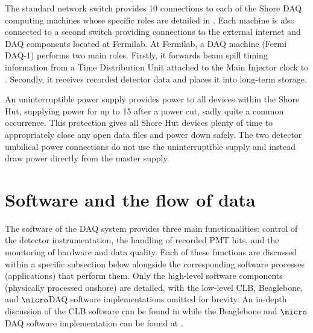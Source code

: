 The standard network switch provides \unit{10}{} connections to each of the Shore DAQ
computing machines whose specific roles are detailed in . Each machine is
also connected to a second switch providing connections to the external internet and DAQ
components located at Fermilab. At Fermilab, a DAQ machine (Fermi DAQ-1) performs two main roles.
Firstly, it forwards \numi beam spill timing information from a Time Distribution Unit attached to
the Main Injector clock to \chipsfive. Secondly, it receives recorded detector data and places it
into long-term storage.

An uninterruptible power supply provides power to all devices within the Shore Hut, supplying
power for up to \unit{15}{} after a power cut, sadly quite a common occurrence. This
protection gives all Shore Hut devices plenty of time to appropriately close any open data files
and power down safely. The two detector umbilical power connections do not use the uninterruptible
supply and instead draw power directly from the master supply.

\section{Software and the flow of data} %
\label{sec:daq_soft} %

The software of the \chipsfive DAQ system provides three main functionalities: control of the
detector instrumentation, the handling of recorded PMT hits, and the monitoring of hardware and
data quality. Each of these functions are discussed within a specific subsection below alongside
the corresponding software processes (applications) that perform them. Only the high-level
software components (physically processed onshore) are detailed, with the low-level CLB,
Beaglebone, and $\micro$DAQ software implementations omitted for brevity. An in-depth discussion
of the CLB software can be found in  while the Beaglebone and $\micro$DAQ
software implementation can be found at .

